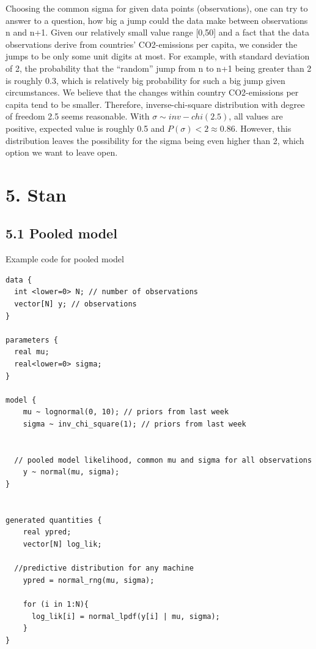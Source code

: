 \documentclass[
]{article}
\begin{document}
Choosing the common sigma for given data points (observations), one can
try to answer to a question, how big a jump could the data make between
observations n and n+1. Given our relatively small value range
{[}0,50{]} and a fact that the data observations derive from countries'
CO2-emissions per capita, we consider the jumps to be only some unit
digits at most. For example, with standard deviation of 2, the
probability that the ``random'' jump from n to n+1 being greater than 2
is roughly 0.3, which is relatively big probability for such a big jump
given circumstances. We believe that the changes within country
CO2-emissions per capita tend to be smaller. Therefore,
inverse-chi-square distribution with degree of freedom 2.5 seems
reasonable. With \(\sigma \sim inv-chi(2.5)\), all values are positive,
expected value is roughly 0.5 and \(P(\sigma) < 2 \approx 0.86\).
However, this distribution leaves the possibility for the sigma being
even higher than 2, which option we want to leave open.

\hypertarget{stan}{%
\section{5. Stan}\label{stan}}

\hypertarget{pooled-model-1}{%
\subsection{5.1 Pooled model}\label{pooled-model-1}}

Example code for pooled model

\begin{verbatim}
data {
  int <lower=0> N; // number of observations
  vector[N] y; // observations
}

parameters {
  real mu;
  real<lower=0> sigma;
}

model {
    mu ~ lognormal(0, 10); // priors from last week
    sigma ~ inv_chi_square(1); // priors from last week
  
  
  // pooled model likelihood, common mu and sigma for all observations
    y ~ normal(mu, sigma);
}


generated quantities {
    real ypred;
    vector[N] log_lik;
  
  //predictive distribution for any machine
    ypred = normal_rng(mu, sigma);
  
    for (i in 1:N){
      log_lik[i] = normal_lpdf(y[i] | mu, sigma);
    }
}
\end{verbatim}
\end{document}
